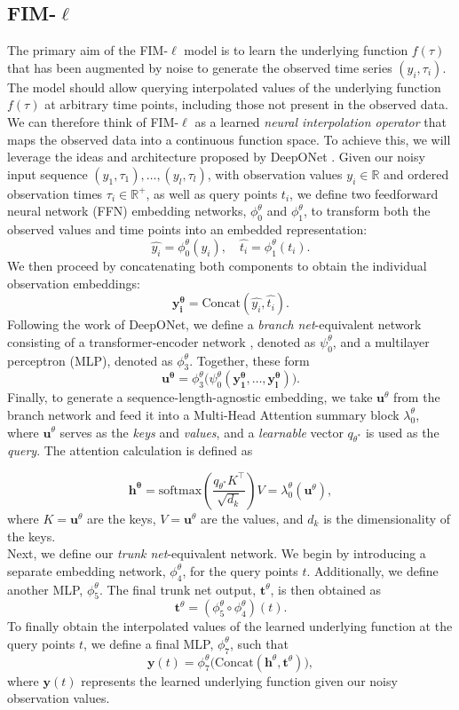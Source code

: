 \documentclass{article}
\theoremstyle{plain}
\theoremstyle{definition}
\theoremstyle{remark}
\begin{document}
\subsection{FIM-$\ell$}\label{sec:FIM-l}
The primary aim of the FIM-$\ell$ model is to learn the underlying function $f(\tau)$ that has been augmented by noise to generate the observed time series $(y_i, \tau_i)$. The model should allow querying interpolated values of the underlying function $f(\tau)$ at arbitrary time points, including those not present in the observed data.
We can therefore think of FIM-$\ell$ as a learned \emph{neural interpolation operator} that maps the observed data into a continuous function space. To achieve this, we will leverage the ideas and architecture proposed by DeepONet \cite{Deeponet}.
Given our noisy input sequence \((y_1, \tau_1), \ldots, (y_l, \tau_l)\), with observation values \(y_i \in \mathbb{R}\) and ordered observation times \(\tau_i \in \mathbb{R}^+\), as well as query points \(t_i\), we define two feedforward neural network (FFN) embedding networks, \(\phi^{\theta}_0\) and \(\phi^{\theta}_1\), to transform both the observed values and time points into an embedded representation:
\[
    \hat{y_i} = \phi^{\theta}_0(y_i), \quad
    \hat{t_i} = \phi^{\theta}_1(t_i).
\]
We then proceed by concatenating both components to obtain the individual observation embeddings:
\[
    \mathbf{y^{\theta}_i} = \text{Concat}(\hat{y_i}, \hat{t_i}).
\]
Following the work of DeepONet, we define a \emph{branch net}-equivalent network consisting of a transformer-encoder network \cite{??}, denoted as $\psi^{\theta}_0$, and a multilayer perceptron (MLP), denoted as $\phi^{\theta}_3$. Together, these form
\[
    \mathbf{u^{\theta}} = \phi^{\theta}_3\big(\psi^{\theta}_0(\mathbf{y^{\theta}_1}, \dots, \mathbf{y^{\theta}_l})\big).
\]
Finally, to generate a sequence-length-agnostic embedding, we take \(\mathbf{u}^{\theta}\) from the branch network and feed it into a Multi-Head Attention \cite{} summary block $\lambda^{\theta}_0$, where \(\mathbf{u}^{\theta}\) serves as the \emph{keys} and \emph{values}, and a \emph{learnable} vector \(q_{\theta^*}\) is used as the \emph{query}. The attention calculation is defined as 

\[
\mathbf{h^{\theta}} = \text{softmax}\left(\frac{q_{\theta^*} K^\top}{\sqrt{d_k}}\right) V = \lambda^{\theta}_0(\mathbf{u}^{\theta}),
\]
where \(K = \mathbf{u}^{\theta}\) are the keys, \(V = \mathbf{u}^{\theta}\) are the values, and \(d_k\) is the dimensionality of the keys.\\
Next, we define our \emph{trunk net}-equivalent network. We begin by introducing a separate embedding network, $\phi^{\theta}_4$, for the query points $t$. Additionally, we define another MLP, $\phi^{\theta}_5$. The final trunk net output, $\mathbf{t}^{\theta}$, is then obtained as
\[
    \mathbf{t}^{\theta} = (\phi^{\theta}_5 \circ \phi^{\theta}_4)(t).
\]
To finally obtain the interpolated values of the learned underlying function at the query points $t$, we define a final MLP, $\phi^{\theta}_7$, such that
\[
    \mathbf{y}(t) = \phi^{\theta}_7\big(\text{Concat}(\mathbf{h}^{\theta}, \mathbf{t}^{\theta})\big),
\]
where $\mathbf{y}(t)$ represents the learned underlying function given our noisy observation values.
\end{document}
